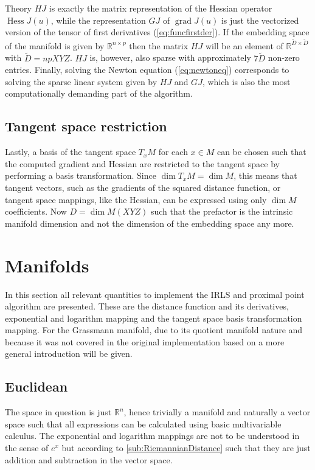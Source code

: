 \begin{chapter}{Theory}
$HJ$ is exactly the matrix representation of the Hessian operator $\operatorname{Hess}J(u)$, while the representation $GJ$ of $\operatorname{grad}J(u)$ is just the vectorized version
of the tensor of first derivatives (\ref{eq:funcfirstder}). If the embedding space of the manifold is given by $\mathbb{R}^{n\times p}$ then the matrix $HJ$
will be an element of $\mathbb{R}^{\tilde D\times\tilde D}$ with $\tilde D=npXYZ$. $HJ$ is, however, also sparse with approximately $7\tilde D$ non-zero entries.
Finally, solving the Newton equation (\ref{eq:newtoneq}) corresponds to solving the sparse linear system given by $HJ$ and $GJ$, which is also the most computationally demanding
part of the algorithm.

\subsection{Tangent space restriction} %
\label{sub:Tangent space restriction}
Lastly, a basis of the tangent space $T_xM$ for each $x\in M$ can be chosen such that the computed gradient and Hessian are restricted to the tangent space by performing a basis transformation. Since $\operatorname{dim}T_xM=\operatorname{dim} M$, this means that tangent vectors, such as the gradients 
of the squared distance function, or tangent space mappings, like the Hessian, can be expressed using only $\operatorname{dim} M$ coefficients. Now $D=\operatorname{dim}M (XYZ)$ such that the prefactor is the intrinsic manifold dimension and not the dimension of the embedding space any more.



\section{Manifolds} %
\label{sec:Manifolds}
In this section all relevant quantities to implement the IRLS and proximal point algorithm are presented. These are the distance function and its derivatives,
exponential and logarithm mapping and the tangent space basis transformation mapping. 
For the Grassmann manifold, due to its quotient manifold nature and because it was not covered in the original implementation based on \cite{SprecherIRLS}
a more general introduction will be given.

\subsection{Euclidean} %
\label{sub:Euclidian}
The space in question is just $\mathbb{R}^n$, hence trivially a manifold and naturally a vector space such that all expressions can be calculated using basic
multivariable calculus. The exponential and logarithm mappings are not to be understood in the sense of $e^x$ but according to \ref{sub:RiemannianDistance} such that
they are just addition and subtraction in the vector space.


\end{chapter}
